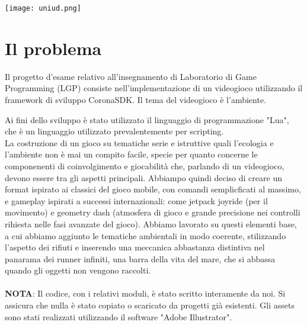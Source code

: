 \documentclass[12pt]{article}
\begin{document}
\begin{titlepage}



\texttt{[image: uniud.png]}\\[1cm] %
 

\vfill %

\end{titlepage}
\tableofcontents
\clearpage
\section{Il problema}
Il progetto d’esame relativo all’insegnamento di Laboratorio di Game Programming (LGP) consiste nell’implementazione di un videogioco utilizzando il framework di sviluppo CoronaSDK. Il tema del videogioco è l'ambiente. 

Ai fini dello sviluppo è stato utilizzato il linguaggio di programmazione "Lua", che è un linguaggio utilizzato prevalentemente per scripting.
\\

La costruzione di un gioco su tematiche serie e istruttive quali l'ecologia e l'ambiente non è mai un compito facile, specie per quanto concerne le componenenti di coinvolgimento e giocabilità che, parlando di un videogioco, devono essere tra gli aspetti principali. Abbiampo quindi deciso di creare un format ispirato ai classici del gioco mobile, con comandi semplicficati al massimo, e gameplay ispirati a successi internazionali: come jetpack joyride (per il movimento) e geometry dash (atmosfera di gioco e grande precisione nei controlli rihiesta nelle fasi avanzate del gioco). Abbiamo lavorato su questi elementi base, a cui abbiamo aggiunto le tematiche ambientali in modo coerente, stilizzando l'aspetto dei rifiuti e inserendo una meccanica abbastanza distintiva nel panarama dei runner infiniti, una barra della vita del mare, che si abbassa quando gli oggetti non vengono raccolti.
\\\\
\textbf{NOTA}: Il codice, con i relativi moduli, è stato scritto interamente da noi. Si assicura che nulla è stato copiato o scaricato da progetti già esistenti. Gli assets sono stati realizzati utilizzando il software "Adobe Illustrator".
\end{document}
